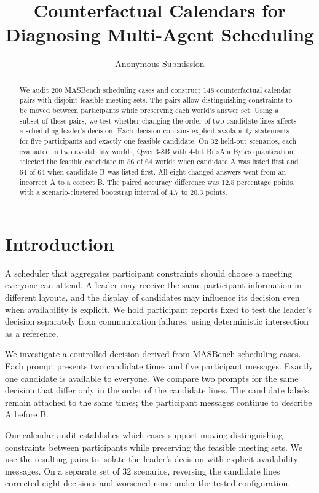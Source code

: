\documentclass[letterpaper]{article}
\title{Counterfactual Calendars for Diagnosing Multi-Agent Scheduling}
\author{Anonymous Submission}
\begin{document}
\maketitle

\begin{abstract}

We audit 200 MASBench scheduling cases and construct 148 counterfactual calendar pairs with disjoint feasible meeting sets. The pairs allow distinguishing constraints to be moved between participants while preserving each world's answer set. Using a subset of these pairs, we test whether changing the order of two candidate lines affects a scheduling leader's decision. Each decision contains explicit availability statements for five participants and exactly one feasible candidate. On 32 held-out scenarios, each evaluated in two availability worlds, Qwen3-8B with 4-bit BitsAndBytes quantization selected the feasible candidate in 56 of 64 worlds when candidate A was listed first and 64 of 64 when candidate B was listed first. All eight changed answers went from an incorrect A to a correct B. The paired accuracy difference was 12.5 percentage points, with a scenario-clustered bootstrap interval of 4.7 to 20.3 points.

\end{abstract}
\section{Introduction}

A scheduler that aggregates participant constraints should choose a meeting everyone can attend. A leader may receive the same participant information in different layouts, and the display of candidates may influence its decision even when availability is explicit. We hold participant reports fixed to test the leader's decision separately from communication failures, using deterministic intersection as a reference.

We investigate a controlled decision derived from MASBench scheduling cases. Each prompt presents two candidate times and five participant messages. Exactly one candidate is available to everyone. We compare two prompts for the same decision that differ only in the order of the candidate lines. The candidate labels remain attached to the same times; the participant messages continue to describe A before B.

Our calendar audit establishes which cases support moving distinguishing constraints between participants while preserving the feasible meeting sets. We use the resulting pairs to isolate the leader's decision with explicit availability messages. On a separate set of 32 scenarios, reversing the candidate lines corrected eight decisions and worsened none under the tested configuration.
\end{document}
